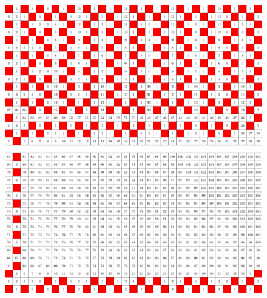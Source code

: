 \begin{figure}[]
\centering
\includegraphics[width=\textwidth]{figures/4/18x33x2_numbered_heatmap.pdf}
\caption{}
\label{fig:6x9x2}
\end{figure} 







